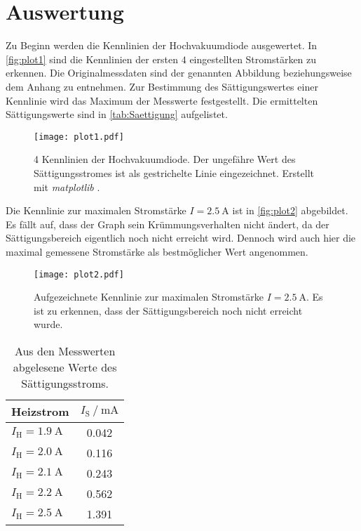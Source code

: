 \section{Auswertung}
\label{sec:Auswertung}
Zu Beginn werden die Kennlinien der Hochvakuumdiode ausgewertet. In \autoref{fig:plot1} sind die Kennlinien der ersten $4$ eingestellten Stromstärken zu erkennen. 
Die Originalmessdaten sind der genannten Abbildung beziehungsweise dem Anhang zu entnehmen. Zur Bestimmung des Sättigungswertes einer Kennlinie wird das Maximum der Messwerte
festgestellt. Die ermittelten Sättigungswerte sind in \autoref{tab:Saettigung} aufgelistet.

\begin{figure}
  \centering
  \texttt{[image: plot1.pdf]}
  \caption{4 Kennlinien der Hochvakuumdiode. Der ungefähre Wert des Sättigungsstromes ist als gestrichelte Linie eingezeichnet.
           Erstellt mit \textit{matplotlib} \cite{matplotlib}.}
  \label{fig:plot1}
\end{figure}

Die Kennlinie zur maximalen Stromstärke $I = \qty{2.5}{\ampere}$ ist in \autoref{fig:plot2} abgebildet. Es fällt auf, dass der Graph sein Krümmungsverhalten nicht ändert, 
da der Sättigungsbereich eigentlich noch nicht erreicht wird. Dennoch wird auch hier die maximal gemessene Stromstärke als bestmöglicher Wert angenommen.

\begin{figure}[H]
  \centering
  \texttt{[image: plot2.pdf]}
  \caption{Aufgezeichnete Kennlinie zur maximalen Stromstärke $I = \qty{2.5}{\ampere}$. Es ist zu erkennen, dass der Sättigungsbereich noch nicht erreicht wurde.}
  \label{fig:plot2}
\end{figure}

\begin{table}[H]
  \centering
  \caption{Aus den Messwerten abgelesene Werte des Sättigungsstroms.}
  \label{tab:Saettigung}
  \begin{tabular}{l S[table-format = 1.3]}
    \toprule
      {Heizstrom} & {$I_\text{S} \mathbin{/} \unit{\milli\ampere}$} \\
      \midrule
      {$ I_\text{H} = \qty{1.9}{\ampere}$} & 0.042 \\
      {$ I_\text{H} = \qty{2.0}{\ampere}$} & 0.116 \\
      {$ I_\text{H} = \qty{2.1}{\ampere}$} & 0.243 \\
      {$ I_\text{H} = \qty{2.2}{\ampere}$} & 0.562 \\
      {$ I_\text{H} = \qty{2.5}{\ampere}$} & 1.391 \\
    \bottomrule
  \end{tabular}
\end{table}

